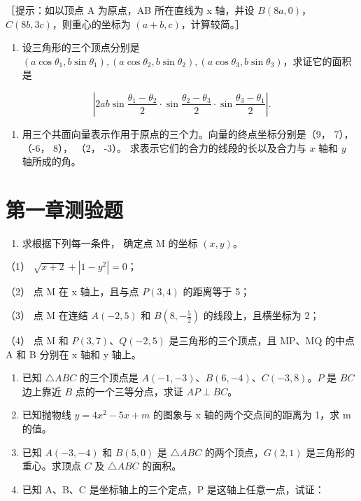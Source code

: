 ［提示：如以顶点 A 为原点，AB 所在直线为 x 轴，并设 \(B(8a, 0)\)，
\(C(8b, 3c)\)，则重心的坐标为 \((a+b, c)\)，计算较简。］

\begin{enumerate}
\def\labelenumi{\arabic{enumi}.}
\setcounter{enumi}{8}
\tightlist
\item
  设三角形的三个顶点分别是
  \((a\cos \theta_1, b\sin \theta_1), (a\cos \theta_2, b\sin \theta_2), (a\cos \theta_3, b\sin \theta_3)\)，求证它的面积是
\end{enumerate}

\[
\left| 2 a b \sin \frac {\theta_{1} - \theta_{2}}{2} \cdot \sin \frac {\theta_{2} - \theta_{3}}{2} \cdot \sin \frac {\theta_{3} - \theta_{1}}{2} \right|.
\]

\begin{enumerate}
\def\labelenumi{\arabic{enumi}.}
\setcounter{enumi}{9}
\tightlist
\item
  用三个共面向量表示作用于原点的三个力。向量的终点坐标分别是（9， 7），
  （-6， 8）， （2， -3）。 求表示它们的合力的线段的长以及合力与 \(x\)
  轴和 \(y\) 轴所成的角。
\end{enumerate}

\section{第一章测验题}\label{ux7b2cux4e00ux7ae0ux6d4bux9a8cux9898}

\begin{enumerate}
\def\labelenumi{\arabic{enumi}.}
\tightlist
\item
  求根据下列每一条件， 确定点 M 的坐标 \((x, y)\)。
\end{enumerate}

（1） \(\sqrt{x + 2} + |1 - y^2| = 0\)；

（2） 点 M 在 x 轴上，且与点 \(P(3, 4)\) 的距离等于 5；

（3） 点 M 在连结 \(A(-2,5)\) 和 \(B\left(8,-\frac{5}{2}\right)\)
的线段上，且横坐标为 2；

（4） 点 M 和 \(P(3,7)\)、\(Q(-2,5)\) 是三角形的三个顶点，且 MP、MQ
的中点 A 和 B 分别在 x 轴和 y 轴上。

\begin{enumerate}
\def\labelenumi{\arabic{enumi}.}
\setcounter{enumi}{1}
\item
  已知 \(\triangle ABC\) 的三个顶点是
  \(A(-1, -3)\)、\(B(6, -4)\)、\(C(-3, 8)\)。\(P\) 是 \(BC\) 边上靠近
  \(B\) 点的一个三等分点，求证 \(AP \perp BC\)。
\item
  已知抛物线 \(y=4x^{2}-5x+m\) 的图象与 x 轴的两个交点间的距离为 1，求 m
  的值。
\item
  已知 \(A(-3, -4)\) 和 \(B(5, 0)\) 是 \(\triangle ABC\)
  的两个顶点，\(G(2, 1)\) 是三角形的重心。求顶点 \(C\) 及
  \(\triangle ABC\) 的面积。
\item
  已知 A、B、C 是坐标轴上的三个定点，P 是这轴上任意一点，试证：
\end{enumerate}

